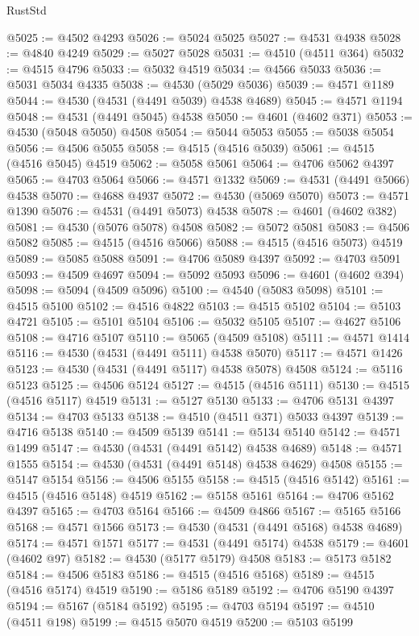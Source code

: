 \begin{lexlean}{RustStd}
\begin{coremodule}
{\begin{coremodule}
{{{{{{{{{{{{{{{{{{{{{{{{{{{{{{{{{{{{{{{{{{{{{{{{{{{{{{{@5025 := @4502 @4293
@5026 := @5024 @5025
@5027 := @4531 @4938
@5028 := @4840 @4249
@5029 := @5027 @5028
@5031 := @4510 (@4511 @364)
@5032 := @4515 @4796
@5033 := @5032 @4519
@5034 := @4566 @5033
@5036 := @5031 @5034 @4335
@5038 := @4530 (@5029 @5036)
@5039 := @4571 @1189
@5044 := @4530 (@4531 (@4491 @5039) @4538 @4689)
@5045 := @4571 @1194
@5048 := @4531 (@4491 @5045) @4538
@5050 := @4601 (@4602 @371)
@5053 := @4530 (@5048 @5050) @4508
@5054 := @5044 @5053
@5055 := @5038 @5054
@5056 := @4506 @5055
@5058 := @4515 (@4516 @5039)
@5061 := @4515 (@4516 @5045) @4519
@5062 := @5058 @5061
@5064 := @4706 @5062 @4397
@5065 := @4703 @5064
@5066 := @4571 @1332
@5069 := @4531 (@4491 @5066) @4538
@5070 := @4688 @4937
@5072 := @4530 (@5069 @5070)
@5073 := @4571 @1390
@5076 := @4531 (@4491 @5073) @4538
@5078 := @4601 (@4602 @382)
@5081 := @4530 (@5076 @5078) @4508
@5082 := @5072 @5081
@5083 := @4506 @5082
@5085 := @4515 (@4516 @5066)
@5088 := @4515 (@4516 @5073) @4519
@5089 := @5085 @5088
@5091 := @4706 @5089 @4397
@5092 := @4703 @5091
@5093 := @4509 @4697
@5094 := @5092 @5093
@5096 := @4601 (@4602 @394)
@5098 := @5094 (@4509 @5096)
@5100 := @4540 (@5083 @5098)
@5101 := @4515 @5100
@5102 := @4516 @4822
@5103 := @4515 @5102
@5104 := @5103 @4721
@5105 := @5101 @5104
@5106 := @5032 @5105
@5107 := @4627 @5106
@5108 := @4716 @5107
@5110 := @5065 (@4509 @5108)
@5111 := @4571 @1414
@5116 := @4530 (@4531 (@4491 @5111) @4538 @5070)
@5117 := @4571 @1426
@5123 := @4530 (@4531 (@4491 @5117) @4538 @5078) @4508
@5124 := @5116 @5123
@5125 := @4506 @5124
@5127 := @4515 (@4516 @5111)
@5130 := @4515 (@4516 @5117) @4519
@5131 := @5127 @5130
@5133 := @4706 @5131 @4397
@5134 := @4703 @5133
@5138 := @4510 (@4511 @371) @5033 @4397
@5139 := @4716 @5138
@5140 := @4509 @5139
@5141 := @5134 @5140
@5142 := @4571 @1499
@5147 := @4530 (@4531 (@4491 @5142) @4538 @4689)
@5148 := @4571 @1555
@5154 := @4530 (@4531 (@4491 @5148) @4538 @4629) @4508
@5155 := @5147 @5154
@5156 := @4506 @5155
@5158 := @4515 (@4516 @5142)
@5161 := @4515 (@4516 @5148) @4519
@5162 := @5158 @5161
@5164 := @4706 @5162 @4397
@5165 := @4703 @5164
@5166 := @4509 @4866
@5167 := @5165 @5166
@5168 := @4571 @1566
@5173 := @4530 (@4531 (@4491 @5168) @4538 @4689)
@5174 := @4571 @1571
@5177 := @4531 (@4491 @5174) @4538
@5179 := @4601 (@4602 @97)
@5182 := @4530 (@5177 @5179) @4508
@5183 := @5173 @5182
@5184 := @4506 @5183
@5186 := @4515 (@4516 @5168)
@5189 := @4515 (@4516 @5174) @4519
@5190 := @5186 @5189
@5192 := @4706 @5190 @4397
@5194 := @5167 (@5184 @5192)
@5195 := @4703 @5194
@5197 := @4510 (@4511 @198)
@5199 := @4515 @5070 @4519
@5200 := @5103 @5199
}}}}}}}}}}}}}}}}}}}}}}}}}}}}}}}}}}}}}}}}}}}}}}}}}}}}}}}
\end{coremodule}}
\end{coremodule}
\end{lexlean}
